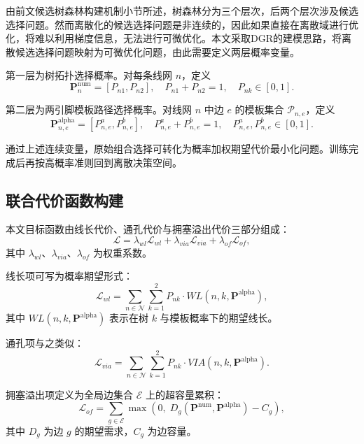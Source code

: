 由前文候选树森林构建机制小节所述，树森林分为三个层次，后两个层次涉及候选选择问题。然而离散化的候选选择问题是非连续的，因此如果直接在离散域进行优化，将难以利用梯度信息，无法进行可微优化。本文采取DGR\cite{10.1145/3649329.3656530}的建模思路，将离散候选选择问题映射为可微优化问题，由此需要定义两层概率变量。

第一层为树拓扑选择概率。对每条线网 $n$，定义
\begin{equation}
    \mathbf{P}^{\mathrm{num}}_n=[P_{n1},P_{n2}],\quad
    P_{n1}+P_{n2}=1,\quad P_{nk}\in[0,1].
\end{equation}

第二层为两引脚模板路径选择概率。对线网 $n$ 中边 $e$ 的模板集合 $\mathcal{P}_{n,e}$，定义
\begin{equation}
    \mathbf{P}^{\mathrm{alpha}}_{n,e}=[P_{n,e}^{a},P_{n,e}^{b}],\quad
    P_{n,e}^{a}+P_{n,e}^{b}=1,\quad P_{n,e}^{a},P_{n,e}^{b}\in[0,1].
\end{equation}

通过上述连续变量，原始组合选择可转化为概率加权期望代价最小化问题。训练完成后再按高概率准则回到离散决策空间。

\subsection{联合代价函数构建}

本文目标函数由线长代价、通孔代价与拥塞溢出代价三部分组成：
\begin{equation}
    \mathcal{L}=\lambda_{wl}\mathcal{L}_{wl}+\lambda_{via}\mathcal{L}_{via}+\lambda_{of}\mathcal{L}_{of},
\end{equation}
其中 $\lambda_{wl}$、$\lambda_{via}$、$\lambda_{of}$ 为权重系数。

线长项可写为概率期望形式：
\begin{equation}
    \mathcal{L}_{wl}=\sum_{n\in\mathcal{N}}\sum_{k=1}^{2}P_{nk}\cdot WL(n,k,\mathbf{P}^{\mathrm{alpha}}),
\end{equation}
其中 $WL(n,k,\mathbf{P}^{\mathrm{alpha}})$ 表示在树 $k$ 与模板概率下的期望线长。

通孔项与之类似：
\begin{equation}
    \mathcal{L}_{via}=\sum_{n\in\mathcal{N}}\sum_{k=1}^{2}P_{nk}\cdot VIA(n,k,\mathbf{P}^{\mathrm{alpha}}).
\end{equation}

拥塞溢出项定义为全局边集合 $\mathcal{E}$ 上的超容量累积：
\begin{equation}
    \mathcal{L}_{of}=\sum_{g\in\mathcal{E}}\max\left(0,\;D_g(\mathbf{P}^{\mathrm{num}},\mathbf{P}^{\mathrm{alpha}})-C_g\right),
\end{equation}
其中 $D_g$ 为边 $g$ 的期望需求，$C_g$ 为边容量。

